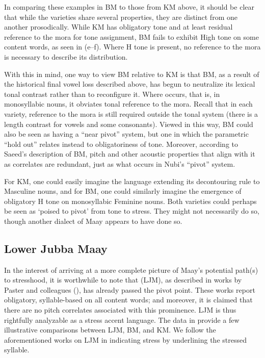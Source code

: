 \documentclass[output=paper,colorlinks,citecolor=brown]{langscibook}
\begin{document}
In comparing these examples in BM to those from KM above, it should be clear that while the varieties share several properties, they are distinct from one another prosodically. While KM has  obligatory tone and at least residual reference to the mora for tone assignment, BM fails to exhibit High tone on some content words, as seen in (e--f). Where H tone is present, no reference to the mora is necessary to describe its distribution. 

With this in mind, one way to view BM relative to KM is that BM, as a result of the historical final vowel loss described above, has begun to neutralize its lexical tonal contrast rather than to reconfigure it. Where  occurs, that is, in monosyllabic nouns, it obviates tonal reference to the mora. Recall that in each variety, reference to the mora is still required outside the tonal system (there is a length contrast for vowels and some consonants). Viewed in this way, BM could also be seen as having a ``near pivot'' system, but one in which the parametric ``hold out'' relates instead to obligatoriness of tone. Moreover, according to Saeed's description of BM, pitch and other acoustic properties that align with it as  correlates are redundant, just as what occurs in Nubi's ``pivot'' system.

For KM, one could easily imagine the language extending its decontouring rule to Masculine nouns, and for BM, one could similarly imagine the emergence of obligatory H tone on monosyllabic Feminine nouns. Both varieties could perhaps be seen as `poised to pivot' from tone to stress. They might not necessarily do so, though another dialect of Maay appears to have done so.

\subsection{Lower Jubba Maay}

In the interest of arriving at a more complete picture of Maay's potential path(s) to stresshood, it is worthwhile to note that  (LJM), as described in works by Paster and colleagues (\citealt{ComfortPaster2009,paster07, OptionalmultiplepluralmarkinginMaayPaster10, Paster2018, PasterRanero2015}), has already passed the pivot point. These works report obligatory, syllable-based  on all content words; and moreover, it is claimed that there are no pitch correlates associated with this prominence. LJM is thus rightfully analyzable as a stress accent language. The data in  provide a few illustrative comparisons between LJM, BM, and KM. We follow the aforementioned works on LJM in indicating stress by underlining the stressed syllable.
\end{document}
